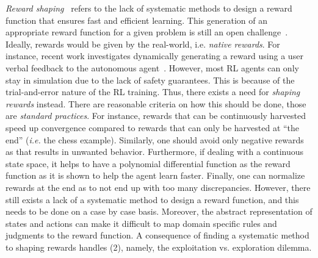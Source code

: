 \emph{Reward shaping}~\cite{laud2011} refers to the lack of systematic methods to design a reward
  function that ensures fast and efficient learning. This generation of an appropriate 
reward function for a given problem is still an open challenge~\cite{kober2013}.
Ideally, rewards would be given by the real-world, i.e. \textit{native rewards}. For instance, recent work investigates dynamically generating a reward 
using a user verbal feedback to the autonomous agent~\cite{gonzalez2010}. However, most RL agents 
can only stay in simulation due to the lack of safety guarantees. This is because of the trial-and-error nature of the RL training. 
Thus, there exists a need for \textit{shaping rewards} instead. There are reasonable criteria on how this should be done, those are \emph{standard practices}. For instance, 
rewards that can be continuously harvested speed up convergence
compared to rewards that can only be harvested at ``the end''
(\emph{i.e.} the chess example). Similarly, one should avoid only 
negative rewards as that results in unwanted behavior. Furthermore, if dealing with a continuous state space, it helps to have a polynomial differential function as the reward function 
as it is shown to help the agent learn faster. Finally, one can normalize rewards at the end as to not end up with too many discrepancies. 
However, there still exists a lack of a systematic method to design a
reward function, and this needs to be done on a case by case basis.
%
Moreover, the abstract representation of states and actions can make
it difficult to map domain specific rules and judgments to the reward
function. A consequence of finding a systematic method to shaping
rewards handles (2), namely, the exploitation vs. exploration
dilemma.

\medskip


